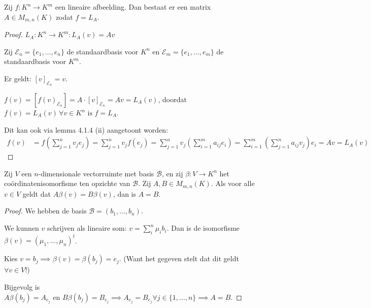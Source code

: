 \begin{gevolg}[4.1.6]
    Zij $f \colon K^n \to K^m$ een lineaire afbeelding. Dan bestaat er een matrix $A \in M_{m,n}(K)$ zodat $f = L_A$.
\end{gevolg}
\begin{proof}
    \(L_A: K^n \to K^m: L_A(v) = Av\)

    Zij \(\mathcal{E}_n = \{e_1, \dots, e_n\}\) de standaardbasis voor \(K^n\)
    en \(\mathcal{E}_m = \{e_1, \dots, e_m\}\) de standaardbasis voor \(K^m\).

    Er geldt: \([v]_{\mathcal{E}_n} = v\).

    \(f(v) =[f(v)_{\mathcal{E}_n}] = A \cdot [v]_{\mathcal{E}_n} = Av = L_A (v)\), doordat \(f(v) = L_A (v)\, \forall v \in K^n \text{ is } f = L_A.\)

    Dit kan ook via lemma 4.1.4 (ii) aangetoont worden:
    \begin{align*}
    f(v) &= f\left(\sum_{j=1}^n v_j e_j\right)
    = \sum_{j=1}^n v_j f(e_j)
    = \sum_{j=1}^n v_j \left( \sum_{i=1}^m a_{ij} e_i \right)
    = \sum_{i=1}^m \left( \sum_{j=1}^n a_{ij} v_j \right) e_i
    = A v = L_A(v)
    \end{align*}
\end{proof}

\begin{lemma}[4.1.7]
    Zij $V$ een $n$-dimensionale vectorruimte met basis $\mathcal{B}$, en zij $\beta \colon V \to K^n$ het coördinatenisomorfisme ten opzichte van $\mathcal{B}$. Zij $A, B \in M_{m,n}(K)$. Als voor alle $v \in V$ geldt dat $A\beta(v) = B\beta(v)$, dan is $A = B$.
\end{lemma}
\begin{proof}
    We hebben de basis \(\mathcal{B} = (b_1,\dots,b_n)\).

    We kunnen \(v\) schrijven als lineaire som: \(v = \sum_i^n \mu_i b_i\). Dan is de isomorfisme \(\beta (v) = (\mu_1,\dots,\mu_n)^t\).

    Kies \(v = b_j \implies \beta (v)= \beta(b_j) = e_j\). (Want het gegeven stelt dat dit geldt \(\forall v \in V\)!)

    Bijgevolg is
    \(A \beta(b_j) = A_{e_j} \text{ en } B \beta(b_j) =  B_{e_j} \implies A_{e_j} = B_{e_j} \forall j \in \{1,\dots,n\} \implies A=B\).
\end{proof}

